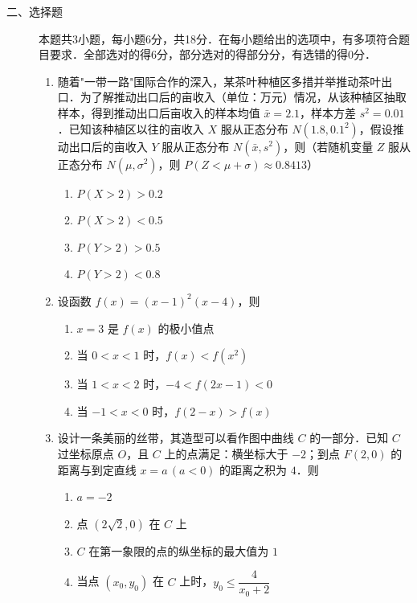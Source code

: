 \begin{description}
    \item[二、选择题] 本题共3小题，每小题6分，共18分．在每小题给出的选项中，有多项符合题目要求．全部选对的得6分，部分选对的得部分分，有选错的得0分．
    \begin{enumerate}[leftmargin=5pt]
      \addtocounter{enumi}{+8}
        \item 随着"一带一路"国际合作的深入，某茶叶种植区多措并举推动茶叶出口．为了解推动出口后的亩收入（单位：万元）情况，从该种植区抽取样本，得到推动出口后亩收入的样本均值 $\bar{x}=2.1$，样本方差 $s^2=0.01$．已知该种植区以往的亩收入 $X$ 服从正态分布 $N(1.8,0.1^2)$，假设推动出口后的亩收入 $Y$ 服从正态分布 $N(\bar{x},s^2)$，则（若随机变量 $Z$ 服从正态分布 $N(\mu,\sigma^2)$，则 $P(Z<\mu+\sigma)\approx0.8413$）
        \begin{enumerate}[label=\Alph*.]
            \item $P(X>2)>0.2$
            \item $P(X>2)<0.5$
            \item $P(Y>2)>0.5$
            \item $P(Y>2)<0.8$
        \end{enumerate}

        \item 设函数 $f(x)=(x-1)^2(x-4)$，则
        \begin{enumerate}[label=\Alph*.]
            \item $x=3$ 是 $f(x)$ 的极小值点
            \item 当 $0<x<1$ 时，$f(x)<f(x^2)$
            \item 当 $1<x<2$ 时，$-4<f(2x-1)<0$
            \item 当 $-1<x<0$ 时，$f(2-x)>f(x)$
        \end{enumerate}

        \item 设计一条美丽的丝带，其造型可以看作图中曲线 $C$ 的一部分．已知 $C$ 过坐标原点 $O$，且 $C$ 上的点满足：横坐标大于 $-2$；到点 $F(2,0)$ 的距离与到定直线 $x=a\,(a<0)$ 的距离之积为 $4$．则
        \begin{enumerate}[label=\Alph*.]
            \item $a=-2$
            \item 点 $(2\sqrt{2},0)$ 在 $C$ 上
            \item $C$ 在第一象限的点的纵坐标的最大值为 $1$
            \item 当点 $(x_0,y_0)$ 在 $C$ 上时，$y_0\leqslant\dfrac{4}{x_0+2}$
        \end{enumerate}
    \end{enumerate}
\end{description}

